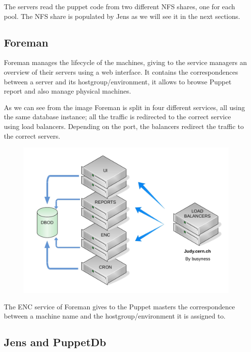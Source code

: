 The servers read the puppet code from two different NFS shares, one for
each pool. The NFS share is populated by Jens as we will see it in the
next sections.

\subsection{Foreman}

Foreman manages the lifecycle of the machines, giving to the service
managers an overview of their servers using a web interface. It contains
the correspondences between a server and its hostgroup/environment, it
allows to browse Puppet report and also manage physical machines.

As we can see from the image Foreman is split in four different services,
all using the same database instance; all the traffic is redirected to the
correct service using load balancers. Depending on the port, the balancers
redirect the traffic to the correct servers.

\begin{figure}[H]
\includegraphics[width=\textwidth,height=\textheight,keepaspectratio]{ConfigurationManagement/Infrastructure_judy.jpg}
\end{figure}

The ENC service of Foreman gives to the Puppet masters the correspondence
between a machine name and the hostgroup/environment it is assigned to.

\subsection{Jens and PuppetDb}

